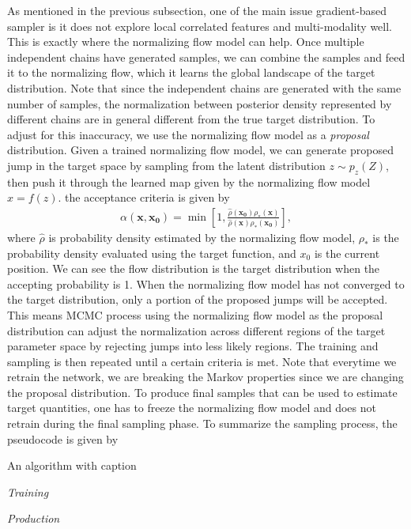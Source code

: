 \documentclass[twocolumn]{aastex631}
\begin{document}
As mentioned in the previous subsection, one of the main issue gradient-based
sampler is it does not explore local correlated features and multi-modality well. This
is exactly where the normalizing flow model can help. Once multiple independent
chains have generated samples, we can combine the samples and feed it to the
normalizing flow, which it learns the global landscape of the target
distribution. Note that since the independent chains are generated with the same
number of samples, the normalization between posterior density represented by
different chains are in general different from the true target distribution. To
adjust for this inaccuracy, we use the normalizing flow model as a
\textit{proposal} distribution. Given a trained normalizing flow model, we can
generate proposed jump in the target space by sampling from the latent
distribution $z \sim p_z(Z)$, then push it through the learned map given by the
normalizing flow model $x=f(z)$. the acceptance criteria is given by
\begin{align}
    \alpha(\mathbf{x},\mathbf{x_0}) = \min \left[ 1, \frac{\hat{\rho}(\mathbf{x_0})\rho_*(\mathbf{x})}{\hat{\rho}(\mathbf{x})\rho_*(\mathbf{x_0})}\right],
\end{align}
where $\hat{\rho}$ is probability density estimated by the normalizing flow
model, $\rho_*$ is the probability density evaluated using the target function,
and $x_0$ is the current position. We can see the flow distribution is the
target distribution when the accepting probability is 1. When the normalizing
flow model has not converged to the target distribution, only a portion of the
proposed jumps will be accepted. This means MCMC process using the normalizing
flow model as the proposal distribution can adjust the normalization across
different regions of the target parameter space by rejecting jumps into less
likely regions. The training and sampling is then repeated until a certain
criteria is met. Note that everytime we retrain the network, we are breaking the
Markov properties since we are changing the proposal distribution. To produce
final samples that can be used to estimate target quantities, one has to freeze
the normalizing flow model and does not retrain during the final sampling phase.
To summarize the sampling process, the pseudocode is given by

\begin{algorithm}
\caption{An algorithm with caption}\label{alg:cap}
\emph{Training}\;

\emph{Production}\;
\end{algorithm}
\end{document}
